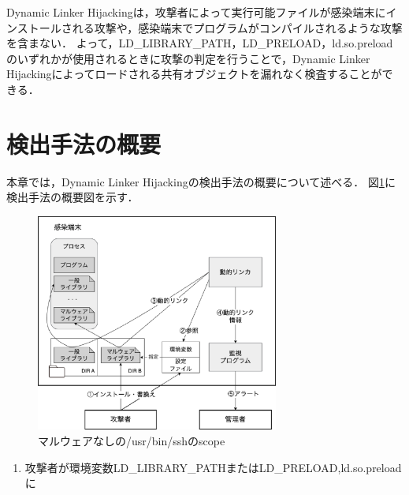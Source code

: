 \documentclass[submit,techreq,noauthor]{eco}	%
\begin{document}
 Dynamic Linker Hijackingは，攻撃者によって実行可能ファイルが感染端末にインストールされる攻撃や，感染端末でプログラムがコンパイルされるような攻撃を含まない．
 よって，LD\_LIBRARY\_PATH，LD\_PRELOAD，ld.so.preloadのいずれかが使用されるときに攻撃の判定を行うことで，Dynamic Linker Hijackingによってロードされる共有オブジェクトを漏れなく検査することができる．\\



\section{検出手法の概要}
本章では，Dynamic Linker Hijackingの検出手法の概要について述べる．
図\ref{fig:method}に検出手法の概要図を示す．

\begin{figure}[t]
	\centering
  \includegraphics[width=8cm]{fig/method.eps}
	\caption{マルウェアなしの/usr/bin/sshのscope}
	\label{fig:method}
\end{figure}

\begin{enumerate}
  \item 攻撃者が環境変数LD\_LIBRARY\_PATHまたはLD\_PRELOAD,ld.so.preloadに
\end{enumerate}
\end{document}
